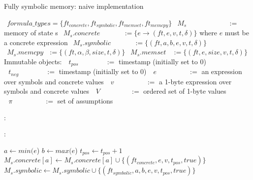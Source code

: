 \documentclass{article}
\begin{document}
\begin{algorithm}
  \normalsize

  \caption{Fully symbolic memory: naive implementation}
	\begin{algorithmic}
		\State $~~formula\_types = \{ft_{concrete}, ft_{symbolic}, ft_{memset}, ft_{memcpy}\}$
		\State $~~M_{s}~~~~~~~~~~~~~~~~~~~~~~~~~~~:=$ memory of state s
		\State $~~M_{s}.concrete~~~~~~~~~~~~~~~:= \{e \to (ft, e,v,t,\delta)\}$ where $e$ must be a concrete expression
		\State $~~M_{s}.symbolic~~~~~~~~~~~~~~~:= \{(ft, a, b, e, v, t,\delta)\}$
		\State $~~M_{s}.memcpy~~~:= \{(ft, \alpha, \beta, size, t, \delta)\}$
		\State $~~M_{s}.memset~~~~:= \{(ft, e, size, v, t, \delta)\}$
  	\State Immutable objects: 
  	\State $~~~t_{pos}~~~~~~~~~~~~~~~\,\,~:=$ timestamp (initially set to 0)
  	\State $~~~t_{neg}~~~~~~~~~~~~~~~\,\,~:=$ timestamp (initially set to 0)
  	\State $~~~e~~~~~~~~~~~~~~~~~~~\,~:=$ an expression over symbols and concrete values
  	\State $~~~v~~~~~~~~~~~~~~~~~~~~\,:=$ a 1-byte expression over symbols and concrete values
  	\State $~~~V~~~~~~~~~~~~~~~~~~~\,:=$ ordered set of 1-byte values
		\State $~~~\pi~~~~~~~~~~~~~~~~~~~~\,:=$ set of assumptions

  \end{algorithmic}

  \bigskip
  
  \begin{algorithmic}[1]
	:
			\State {}
		\EndFor
	\EndFunction
  \end{algorithmic}

  \bigskip

  \begin{algorithmic}[1]
	:
		
		\State $a \leftarrow min(e$)
		\State $b \leftarrow max(e$)
		\State $t_{pos} \leftarrow t_{pos} + 1$
			\State $M_s.concrete[a] \leftarrow M_s.concrete[a] \cup \{(ft_{concrete}, e, v, t_{pos}, true)\}$
		\Else
			\State $M_s.symbolic \leftarrow M_s.symbolic \cup \{(ft_{symbolic}, a, b, e, v, t_{pos}, true)\}$
		\EndIf

	\EndFunction
  \end{algorithmic}


\end{algorithm}
\end{document}
